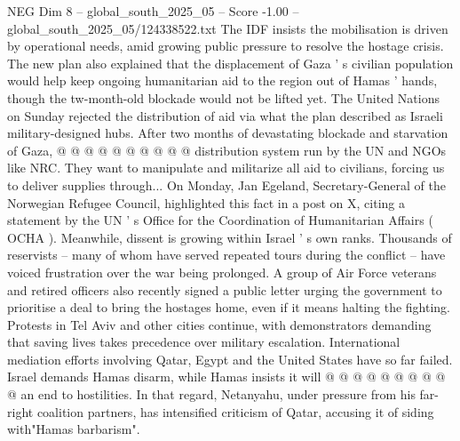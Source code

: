 \begin{textsample}{NEG Dim 8 – global\_south\_2025\_05 – Score -1.00 – global\_south\_2025\_05/124338522.txt}
The IDF insists the mobilisation is driven by operational needs, amid growing public pressure to resolve the hostage crisis.
The new plan also explained that the displacement of Gaza ' s civilian population would help keep ongoing humanitarian aid to the region out of Hamas ' hands, though the tw-month-old blockade would not be lifted yet.
The United Nations on Sunday rejected the distribution of aid via what the plan described as Israeli military-designed hubs.
After two months of devastating blockade and starvation of Gaza, @ @ @ @ @ @ @ @ @ @ distribution system run by the UN and NGOs like NRC.
They want to manipulate and militarize all aid to civilians, forcing us to deliver supplies through...
On Monday, Jan Egeland, Secretary-General of the Norwegian Refugee Council, highlighted this fact in a post on X, citing a statement by the UN ' s Office for the Coordination of Humanitarian Affairs ( OCHA ).
Meanwhile, dissent is growing within Israel ' s own ranks.
Thousands of reservists -- many of whom have served repeated tours during the conflict -- have voiced frustration over the war being prolonged.
A group of Air Force veterans and retired officers also recently signed a public letter urging the government to prioritise a deal to bring the hostages home, even if it means halting the fighting.
Protests in Tel Aviv and other cities continue, with demonstrators demanding that saving lives takes precedence over military escalation.
International mediation efforts involving Qatar, Egypt and the United States have so far failed.
Israel demands Hamas disarm, while Hamas insists it will @ @ @ @ @ @ @ @ @ @ an end to hostilities.
In that regard, Netanyahu, under pressure from his far-right coalition partners, has intensified criticism of Qatar, accusing it of siding with"Hamas barbarism".

\end{textsample}
